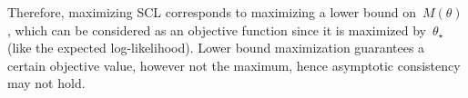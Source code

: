 \documentclass[english]{scrartcl}
\begin{document}
Therefore, maximizing SCL corresponds to maximizing a lower bound on~$M(\theta)$, which can be considered as an objective function since it is maximized by~$\theta_\star$ (like the expected log-likelihood). Lower bound maximization guarantees a certain objective value, however not the maximum, hence asymptotic consistency may not hold.





\end{document}
